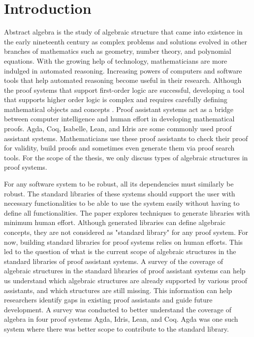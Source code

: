 \chapter{Introduction}
Abstract algebra is the study of algebraic structure that came into existence in
the early nineteenth century as complex problems and solutions evolved in other
branches of mathematics such as geometry, number theory, and polynomial
equations. With the growing help of technology, mathematicians are more indulged
in automated reasoning. Increasing powers of computers and software tools that
help automated reasoning become useful in their research. Although the
proof systems that support first-order logic are successful, developing a tool
that supports higher order logic is complex and requires carefully defining
mathematical objects and concepts \cite{phillips2010automated}. Proof assistant
systems act as a bridge between computer intelligence and human effort in
developing mathematical proofs. Agda, Coq, Isabelle, Lean, and Idris are some
commonly used proof assistant systems. Mathematicians use these proof assistants
to check their proof for validity, build proofs and sometimes even generate them
via proof search tools. For the scope of the thesis, we only discuss types of
algebraic structures in proof systems.

For any software system to be robust, all its dependencies must similarly be
robust. The standard libraries of these systems should support the user with
necessary functionalities to be able to use the system easily without having to
define all functionalities. The paper \cite{BuildingDiamond} explores techniques
to generate libraries with minimum human effort. Although generated libraries
can define algebraic concepts, they are not considered as "standard library"
for any proof system. For now, building standard libraries for proof systems
relies on human efforts. This led to the question of what is the current scope
of algebraic structures in the standard libraries of proof assistant systems. A
survey of the coverage of algebraic structures in the standard libraries of
proof assistant systems can help us understand which algebraic structures are
already supported by various proof assistants, and which structures are still
missing. This information can help researchers identify gaps in existing proof
assistants and guide future development. A survey was conducted to better
understand the coverage of algebra in four proof systems Agda, Idris, Lean, and
Coq. Agda was one such system where there was better scope to contribute to the
standard library.

